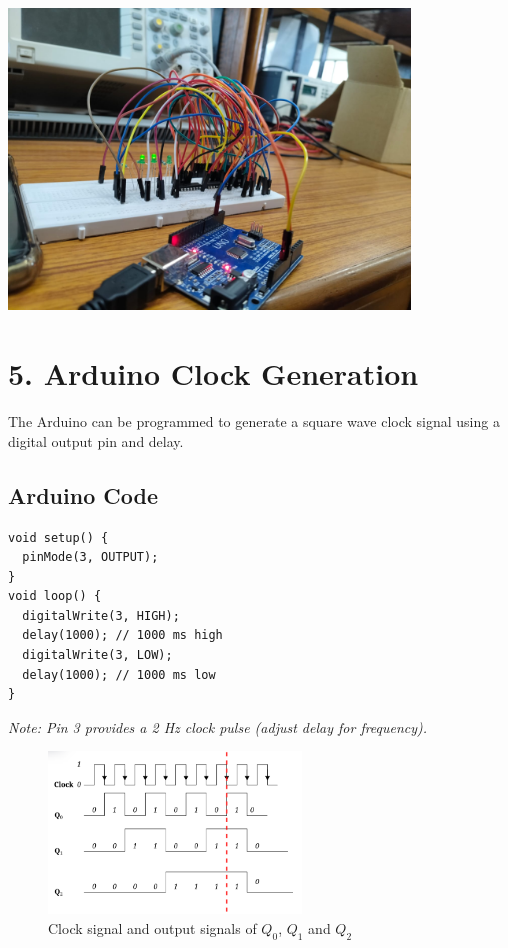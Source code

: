 \documentclass[a4paper,12pt]{article}
\begin{document}
\begin{center}
\includegraphics[width=0.8\textwidth]{figs/ckt.jpeg} %
\end{center}



\section*{5. Arduino Clock Generation}
The Arduino can be programmed to generate a square wave clock signal using a digital output pin and delay.

\subsection*{Arduino Code}
\begin{verbatim}
void setup() {
  pinMode(3, OUTPUT);
}
void loop() {
  digitalWrite(3, HIGH);
  delay(1000); // 1000 ms high
  digitalWrite(3, LOW);
  delay(1000); // 1000 ms low
}
\end{verbatim}

\textit{Note: Pin 3 provides a 2 Hz clock pulse (adjust delay for frequency).}

\begin{figure}[H]
    \centering
    \includegraphics[width=0.6\textwidth]{figs/s.png}  %
    \caption{Clock signal and output signals of $Q_0$, $Q_1$ and $Q_2$}
    \label{fig:example}
\end{figure}
\end{document}
